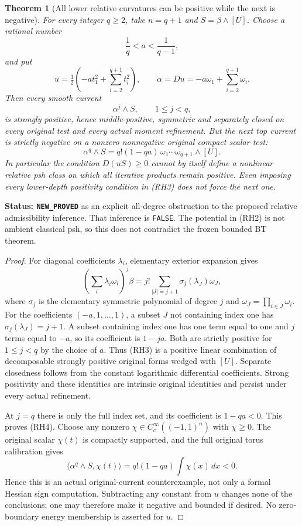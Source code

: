\documentclass[11pt,a4paper]{article}
\numberwithin{equation}{section}
\newtheorem{theorem}{Theorem}[section]
\theoremstyle{definition}
\theoremstyle{remark}
\begin{document}
\begin{theorem}[All lower relative curvatures can be positive while the next is negative]
\label{thm:r12-relative-depth-positivity-failure}
For every integer $q\ge2$, take $n=q+1$ and
$S=\beta\wedge[U]$.  Choose a rational number
\[
                         \frac1q<a<\frac1{q-1},
\]
and put
\[
 u=\tfrac12\left(-a t_1^2+\sum_{i=2}^{q+1}t_i^2\right),
 \qquad\alpha=Du=-a\omega_1+\sum_{i=2}^{q+1}\omega_i.
 \tag{RH2}
\]
Then every smooth current
\[
                        \alpha^j\wedge S,
                             \qquad1\le j<q,
 \tag{RH3}
\]
is strongly positive, hence middle-positive, symmetric and
separately closed on every original test and every actual
moment refinement.  But the next top current is strictly
negative on a nonzero nonnegative original compact scalar test:
\[
       \alpha^q\wedge S
                 =q!(1-qa)\,\omega_1\cdots\omega_{q+1}\wedge[U].
 \tag{RH4}
\]
In particular the condition $D(uS)\ge0$ cannot by itself
define a nonlinear relative psh class on which all iterative
products remain positive.  Even imposing every lower-depth
positivity condition in \textup{(RH3)} does not force the
next one.
\end{theorem}

\noindent\textbf{Status: \texttt{NEW\_PROVED}} as an
explicit all-degree obstruction to the proposed relative
admissibility inference.  That inference is \texttt{FALSE}.
The potential in \textup{(RH2)} is not ambient classical psh,
so this does not contradict the frozen bounded BT theorem.

\begin{proof}
For diagonal coefficients $\lambda_i$, elementary exterior
expansion gives
\[
 \left(\sum_i\lambda_i\omega_i\right)^j\beta
       =j!\sum_{|J|=j+1}\sigma_j(\lambda_J)\omega_J,
 \tag{RH5}
\]
where $\sigma_j$ is the elementary symmetric polynomial of
degree $j$ and $\omega_J=\prod_{i\in J}\omega_i$.
For the coefficients $(-a,1,\ldots,1)$, a subset $J$ not
containing index one has $\sigma_j(\lambda_J)=j+1$.
A subset containing index one has one term equal to one
and $j$ terms equal to $-a$, so its coefficient is $1-ja$.
Both are strictly positive for $1\le j<q$ by the choice
of $a$.  Thus \textup{(RH3)} is a positive linear
combination of decomposable strongly positive original
forms wedged with $[U]$.  Separate closedness follows
from the constant logarithmic differential coefficients.
Strong positivity and these identities are intrinsic
original identities and persist under every actual
refinement.

At $j=q$ there is only the full index set, and its
coefficient is $1-qa<0$.  This proves \textup{(RH4)}.
Choose any nonzero $\chi\in C_c^\infty((-1,1)^n)$ with
$\chi\ge0$.  The original scalar $\chi(t)$ is compactly
supported, and the full original torus calibration gives
\[
 \langle\alpha^q\wedge S,\chi(t)\rangle
                =q!(1-qa)\int\chi(x)\,dx<0.
\]
Hence this is an actual original-current counterexample,
not only a formal Hessian sign computation.  Subtracting
any constant from $u$ changes none of the conclusions;
one may therefore make it negative and bounded if desired.
No zero-boundary energy membership is asserted for $u$.
\end{proof}
\end{document}
